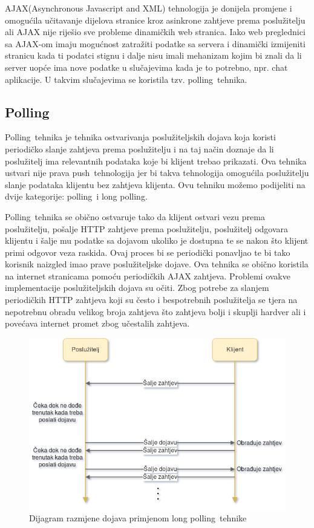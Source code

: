 \documentclass[times, utf8, zavrsni]{fer}
\begin{document}
AJAX(Asynchronous Javascript and XML) tehnologija je donijela promjene i omogućila učitavanje dijelova stranice kroz asinkrone zahtjeve prema poslužitelju ali AJAX nije riješio sve probleme dinamičkih web stranica. Iako web preglednici sa AJAX-om imaju mogućnost zatražiti podatke sa servera i dinamički izmijeniti stranicu kada ti podatci stignu i dalje nisu imali mehanizam kojim bi znali da li server uopće ima nove podatke u slučajevima kada je to potrebno, npr. chat aplikacije. U takvim slučajevima se koristila tzv. \glqq polling\grqq\  tehnika.\citep{gravelle2009comet}

\subsection{Polling}
\glqq Polling\grqq\  tehnika je tehnika ostvarivanja poslužiteljskih dojava koja koristi periodičko slanje zahtjeva prema poslužitelju i na taj način doznaje da li poslužitelj ima relevantnih podataka koje bi klijent trebao prikazati. Ova tehnika ustvari nije prava \glqq push\grqq\  tehnologija jer bi takva tehnologija omogućila poslužitelju slanje podataka klijentu bez zahtjeva klijenta. Ovu tehniku možemo podijeliti na dvije kategorije: \glqq polling\grqq\  i \glqq long polling\grqq .

\glqq Polling\grqq\  tehnika se obično ostvaruje tako da klijent ostvari vezu prema poslužitelju, pošalje HTTP zahtjeve prema poslužitelju, poslužitelj odgovara klijentu i šalje mu podatke sa dojavom ukoliko je dostupna te se nakon što klijent primi odgovor veza raskida. Ovaj proces bi se periodički ponavljao te bi tako korisnik naizgled imao prave poslužiteljske dojave. Ova tehnika se obično koristila na internet stranicama pomoću periodičkih AJAX zahtjeva. Problemi ovakve implementacije poslužiteljskih dojava su očiti. Zbog potrebe za slanjem periodičkih HTTP zahtjeva koji su često i bespotrebnih poslužitelja se tjera na nepotrebnu obradu velikog broja zahtjeva što zahtjeva bolji i skuplji hardver ali i povećava internet promet zbog učestalih zahtjeva.

\begin{figure}[htb]
\centering
\includegraphics[width=14cm]{img/long-polling.png}
\caption{Dijagram razmjene dojava primjenom \glqq long polling\grqq\  tehnike}
\label{fig:long-polling-image}
\end{figure}
\end{document}
